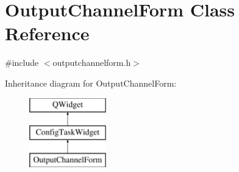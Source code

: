 \hypertarget{class_output_channel_form}{\section{Output\-Channel\-Form Class Reference}
\label{class_output_channel_form}
}


{\ttfamily \#include $<$outputchannelform.\-h$>$}

Inheritance diagram for Output\-Channel\-Form\-:\begin{figure}[H]
\begin{center}
\leavevmode
\includegraphics[height=3.000000cm]{class_output_channel_form}
\end{center}
\end{figure}

